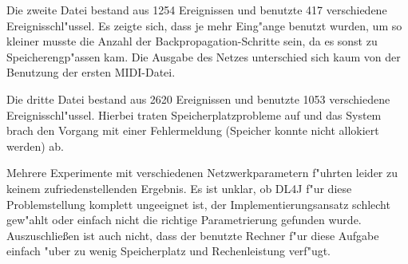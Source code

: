 {Die zweite Datei bestand aus 1254 Ereignissen und benutzte 417 verschiedene Ereignisschl"ussel. Es zeigte sich, dass je mehr Eing"ange benutzt wurden, um so kleiner musste die Anzahl der Backpropagation-Schritte sein, da es sonst zu Speicherengp"assen kam. Die Ausgabe des Netzes unterschied sich kaum von der Benutzung der ersten MIDI-Datei.

Die dritte Datei bestand aus 2620 Ereignissen und benutzte 1053 verschiedene Ereignisschl"ussel. Hierbei traten Speicherplatzprobleme auf und das System brach den Vorgang mit einer Fehlermeldung ({\glqq}Speicher konnte nicht allokiert werden{\grqq}) ab.

Mehrere Experimente mit verschiedenen Netzwerkparametern f"uhrten leider zu keinem zufriedenstellenden Ergebnis. Es ist unklar, ob DL4J f"ur diese Problemstellung komplett ungeeignet ist, der Implementierungsansatz schlecht gew"ahlt oder einfach nicht die richtige Parametrierung gefunden wurde. Auszuschlie{\ss}en ist auch nicht, dass der benutzte Rechner f"ur diese Aufgabe einfach "uber zu wenig Speicherplatz und Rechenleistung verf"ugt.


} %